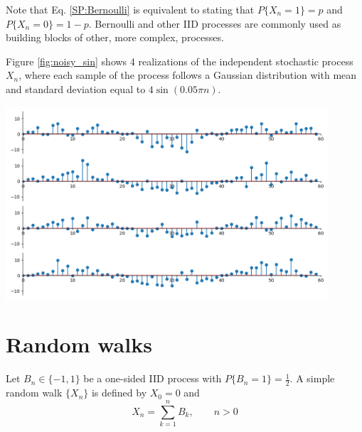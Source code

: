 Note that Eq. \eqref{SP:Bernoulli} is equivalent to stating that $P\{X_n=1\} = p$ and $P\{X_n=0\} = 1-p$. Bernoulli and other IID processes are commonly used as building blocks of other, more complex, processes.

\begin{example}
\label{ejexp}
Figure \ref{fig:noisy_sin} shows 4 realizations of the independent stochastic process $X_n$, where each sample of the process follows a Gaussian distribution with mean and standard deviation equal to $4 \sin\left(0.05 \pi n \right)$. 
\begin{center}
\includegraphics[width=12cm]{Figures/sp_noisy_sin.png} 
\label{fig:noisy_sin}
\end{center}

\end{example}

  

\section{Random walks}

\begin{definition}
Let $B_n \in \{-1, 1\}$ be a one-sided IID process with $P\{B_n=1\}=\frac12$. A simple random walk $\{X_n\}$ is defined by $X_0 = 0$ and
\begin{equation}
X_n = \sum_{k=1}^n B_k,    \qquad n>0
\label{sp:srw_def}
\end{equation}

\end{definition}

